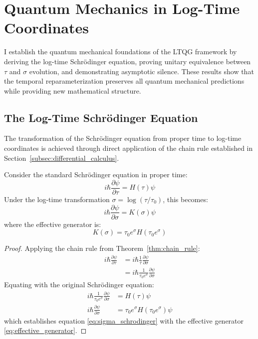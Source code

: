 \section{Quantum Mechanics in Log-Time Coordinates}
\label{sec:quantum_mechanics}

I establish the quantum mechanical foundations of the LTQG framework by deriving the log-time Schrödinger equation, proving unitary equivalence between $\tau$ and $\sigma$ evolution, and demonstrating asymptotic silence. These results show that the temporal reparameterization preserves all quantum mechanical predictions while providing new mathematical structure.

\subsection{The Log-Time Schrödinger Equation}
\label{subsec:sigma_schrodinger}

The transformation of the Schrödinger equation from proper time to log-time coordinates is achieved through direct application of the chain rule established in Section~\ref{subsec:differential_calculus}.

\begin{theorem}
\label{thm:sigma_schrodinger}
Consider the standard Schrödinger equation in proper time:
\begin{equation}
i\hbar \frac{\partial \psi}{\partial \tau} = H(\tau) \psi
\label{eq:tau_schrodinger}
\end{equation}
Under the log-time transformation $\sigma = \log(\tau/\tau_0)$, this becomes:
\begin{equation}
i\hbar \frac{\partial \psi}{\partial \sigma} = K(\sigma) \psi
\label{eq:sigma_schrodinger}
\end{equation}
where the effective generator is:
\begin{equation}
K(\sigma) = \tau_0 e^\sigma H(\tau_0 e^\sigma)
\label{eq:effective_generator}
\end{equation}
\end{theorem}

\begin{proof}
Applying the chain rule from Theorem~\ref{thm:chain_rule}:
\begin{align}
i\hbar \frac{\partial \psi}{\partial \tau} &= i\hbar \frac{1}{\tau} \frac{\partial \psi}{\partial \sigma} \\
&= i\hbar \frac{1}{\tau_0 e^\sigma} \frac{\partial \psi}{\partial \sigma}
\end{align}
Equating with the original Schrödinger equation:
\begin{align}
i\hbar \frac{1}{\tau_0 e^\sigma} \frac{\partial \psi}{\partial \sigma} &= H(\tau) \psi \\
i\hbar \frac{\partial \psi}{\partial \sigma} &= \tau_0 e^\sigma H(\tau_0 e^\sigma) \psi
\end{align}
which establishes equation \eqref{eq:sigma_schrodinger} with the effective generator \eqref{eq:effective_generator}.
\end{proof}

